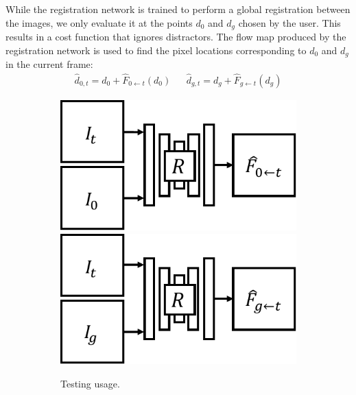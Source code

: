 While the registration network is trained to perform a global registration between the images, we only evaluate it at the points $d_0$ and $d_g$ chosen by the user. This results in a cost function that ignores distractors. The flow map produced by the registration network is used to find the pixel locations corresponding to $d_0$ and $d_g$ in the current frame: 
\begin{align}
\hat{d}_{0,t} = d_0 + \hat{F}_{0 \leftarrow t}(d_0) &&
\hat{d}_{g,t} = d_g + \hat{F}_{g \leftarrow t}(d_g)
\label{eqn:warped_pos}
\end{align}


\begin{figure}[t!]
	\centering
	\begin{subfigure}[b]{0.25\linewidth}
		\centering
		\includegraphics[width=\linewidth]{images_rfr/registration_test_start.pdf}\vspace{2.5mm}
		\includegraphics[width=\linewidth]{images_rfr/registration_test_goal.pdf}
		\caption{\small{Testing usage.}}
	\end{subfigure}
	\quad \quad
	\begin{subfigure}[b]{0.55\linewidth}

\end{subfigure}
\end{figure}
